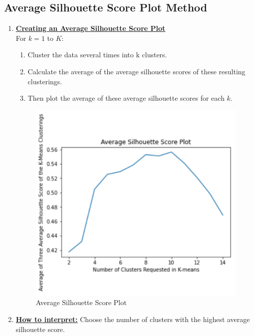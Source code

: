 \documentclass[11pt]{elegantbook}
\begin{document}
\subsection{Average Silhouette Score Plot Method}
\begin{enumerate}[(1).]
    \item \textbf{\underline{Creating an Average Silhouette Score Plot}}\\
    For $k=1$ to $K$:
    \begin{enumerate}[$\bullet$]
        \item Cluster the data several times into k clusters.
        \item Calculate the average of the average silhouette scores of these resulting
        clusterings.
        \item Then plot the average of these average silhouette scores for each $k$.
    \end{enumerate}
    \begin{center}\begin{figure}[htbp]
        \centering
        \includegraphics[scale=0.2]{Average Silhouette Score Plot.png}
        \caption{Average Silhouette Score Plot}
        \label{}
    \end{figure}\end{center}
    \item \textbf{\underline{How to interpret:}} Choose the number of clusters with the highest average silhouette score.

\end{enumerate}
\end{document}
